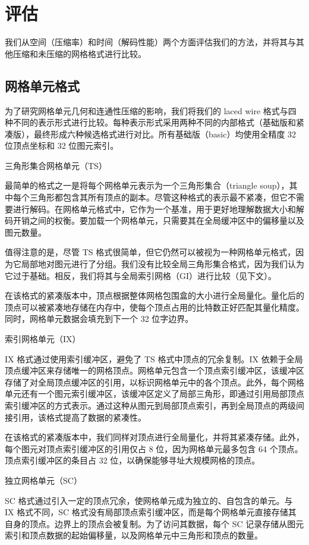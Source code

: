 \section{评估}

我们从空间（压缩率）和时间（解码性能）两个方面评估我们的方法，并将其与其他压缩和未压缩的网格格式进行比较。

\subsection{网格单元格式}

为了研究网格单元几何和连通性压缩的影响，我们将我们的 laced wire 格式与四种不同的表示形式进行比较。每种表示形式采用两种不同的内部格式（基础版和紧凑版），最终形成六种候选格式进行对比。所有基础版（basic）均使用全精度 32 位顶点坐标和 32 位图元索引。

三角形集合网格单元（TS）

最简单的格式之一是将每个网格单元表示为一个三角形集合（triangle soup），其中每个三角形都包含其所有顶点的副本。尽管这种格式的表示最不紧凑，但它不需要进行解码。在网格单元格式中，它作为一个基准，用于更好地理解数据大小和解码开销之间的权衡。要加载一个网格单元，只需要其在全局缓冲区中的偏移量以及图元数量。

值得注意的是，尽管 TS 格式很简单，但它仍然可以被视为一种网格单元格式，因为它局部地对图元进行了分组。我们没有比较全局三角形集合格式，因为我们认为它过于基础。相反，我们将其与全局索引网格（GI）进行比较（见下文）。

在该格式的紧凑版本中，顶点根据整体网格包围盒的大小进行全局量化。量化后的顶点可以被紧凑地存储在内存中，使每个顶点占用的比特数正好匹配其量化精度。同时，网格单元数据会填充到下一个 32 位字边界。

索引网格单元（IX）

IX 格式通过使用索引缓冲区，避免了 TS 格式中顶点的冗余复制。IX 依赖于全局顶点缓冲区来存储唯一的网格顶点。网格单元包含一个顶点索引缓冲区，该缓冲区存储了对全局顶点缓冲区的引用，以标识网格单元中的各个顶点。此外，每个网格单元还有一个图元索引缓冲区，该缓冲区定义了局部三角形，即通过引用局部顶点索引缓冲区的方式表示。通过这种从图元到局部顶点索引，再到全局顶点的两级间接引用，该格式提高了数据的紧凑性。

在该格式的紧凑版本中，我们同样对顶点进行全局量化，并将其紧凑存储。此外，每个图元对顶点索引缓冲区的引用仅占 8 位，因为网格单元最多包含 64 个顶点。顶点索引缓冲区的条目占 32 位，以确保能够寻址大规模网格的顶点。

独立网格单元（SC）

SC 格式通过引入一定的顶点冗余，使网格单元成为独立的、自包含的单元。与 IX 格式不同，SC 格式没有局部顶点索引缓冲区，而是每个网格单元直接存储其自身的顶点。边界上的顶点会被复制。为了访问其数据，每个 SC 记录存储从图元索引和顶点数据的起始偏移量，以及网格单元中三角形和顶点的数量。

